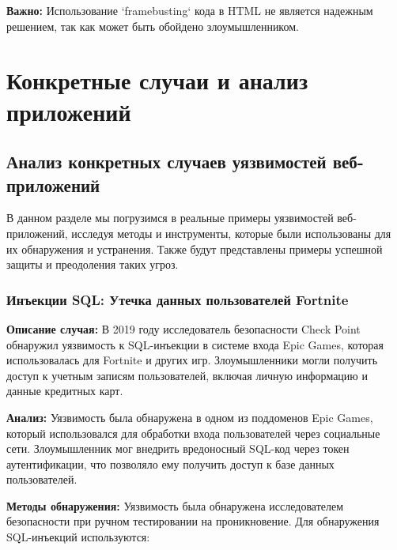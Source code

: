 \documentclass[a4paper,12pt]{diplom}
\begin{document}
	 \textbf{Важно:}  Использование `framebusting` кода в HTML  не является надежным решением, так как может быть обойдено злоумышленником.
	 
	 
	 
	 
	 
	 
	 
	 
	 
	 
	 
	 
	  
	 
	 
	 
	 
	 
	 
	 
	 
	 
	 
	 
	 
	 
	 \chapter{Конкретные случаи и анализ приложений}
	 
	 \section{Анализ конкретных случаев уязвимостей веб-приложений}
	 
	 В данном разделе мы погрузимся в реальные примеры уязвимостей веб-приложений, исследуя методы и инструменты, которые были использованы для их обнаружения и устранения. Также будут представлены примеры успешной защиты и преодоления таких угроз.
	 
	 \subsection{Инъекции SQL: Утечка данных пользователей Fortnite}
	 
	 \textbf{Описание случая:} В 2019 году исследователь безопасности Check Point обнаружил уязвимость к SQL-инъекции в системе входа Epic Games, которая использовалась для Fortnite и других игр.  Злоумышленники могли получить доступ к учетным записям пользователей, включая личную информацию и данные кредитных карт. \cite{Fortnite_attack}
	 
	 \textbf{Анализ:} Уязвимость была обнаружена в одном из поддоменов Epic Games, который использовался для обработки входа пользователей через социальные сети.  Злоумышленник мог внедрить вредоносный SQL-код через токен аутентификации, что позволяло ему получить доступ к базе данных пользователей.
	 
	 \textbf{Методы обнаружения:} Уязвимость была обнаружена исследователем безопасности при ручном тестировании на проникновение. Для обнаружения SQL-инъекций используются:
	 
\end{document}

